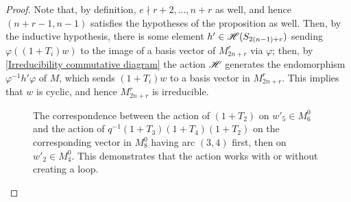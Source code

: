 \documentclass{amsart}
\begin{document}
\begin{proof}
  Note that, by definition, $e \nmid r+2,\dots,n+r$ as well, and hence $(n+r-1,n-1)$ satisfies the hypotheses of the proposition as well.
  Then, by the inductive hypothesis, there is some element $h' \in \mathscr{H}(S_{2(n-1) + r})$ sending $\varphi((1 + T_i)w)$ to the image of a basis vector of $M_{2n + r}^r$ via $\varphi$;
  then, by \eqref{Irreducibility commutative diagram} the action $\mathscr{H}$ generates the endomorphism $\varphi^{-1}h'\varphi$ of $M$, which sends $(1 + T_i)w$ to a basis vector in $M_{2n + r}^r$.
  This implies that $w$ is cyclic, and hence $M_{2n + r}^r$ is irreducible.
  \begin{figure}
  \begin{adjustbox}{width=\textwidth}
     \hspace{20pt} 
  \end{adjustbox}
  \begin{adjustbox}{width=\textwidth}
     \hspace{20pt}
\end{adjustbox}
  \caption{The correspondence between the action of $(1 + T_2)$ on $w'_5 \in M^0_6$ and the action of $q^{-1}(1 + T_3)(1 + T_4)(1 + T_2)$ on the corresponding vector in $M^0_8$ having arc $(3,4)$ first, then on $w'_2 \in M^0_4$.
  This demonstrates that the action works with or without creating a loop.
  }
  \label{bigloop}
  \end{figure}
\end{proof}
\end{document}
